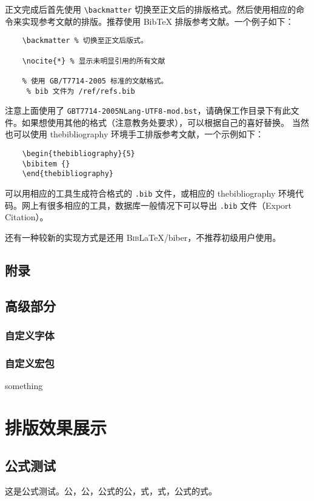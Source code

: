 \documentclass[%
               amsthm,
              ]{xjtubsc}
\begin{document}
正文完成后首先使用 \verb|\backmatter| 切换至正文后的排版格式。然后使用相应的命令来实现参考文献的排版。推荐使用 BibTeX 排版参考文献。一个例子如下：
\begin{verbatim}
    \backmatter % 切换至正文后版式。

    \nocite{*} % 显示未明显引用的所有文献
    
    % 使用 GB/T7714-2005 标准的文献格式。
     % bib 文件为 /ref/refs.bib
\end{verbatim}
注意上面使用了 \verb|GBT7714-2005NLang-UTF8-mod.bst|，请确保工作目录下有此文件。如果想使用其他的格式（注意教务处要求），可以根据自己的喜好替换。
当然也可以使用 thebibliography 环境手工排版参考文献，一个示例如下：
\begin{verbatim}
    \begin{thebibliography}{5}
    \bibitem {}
    \end{thebibliography}
\end{verbatim}

可以用相应的工具生成符合格式的 \verb|.bib| 文件，或相应的 thebibliography 环境代码。网上有很多相应的工具，数据库一般情况下可以导出 \verb|.bib| 文件（Export Citation）。

还有一种较新的实现方式是还用 \textsc{Bib}\LaTeX{}/biber，不推荐初级用户使用。
\subsection{附录}

\subsection{高级部分}

\subsubsection{自定义字体}\label{sec:customfont}
\subsubsection{自定义宏包}
something

\section{排版效果展示}

\subsection{公式测试}
这是公式测试。公，公，公式的公，式，式，公式的式。
\end{document}
